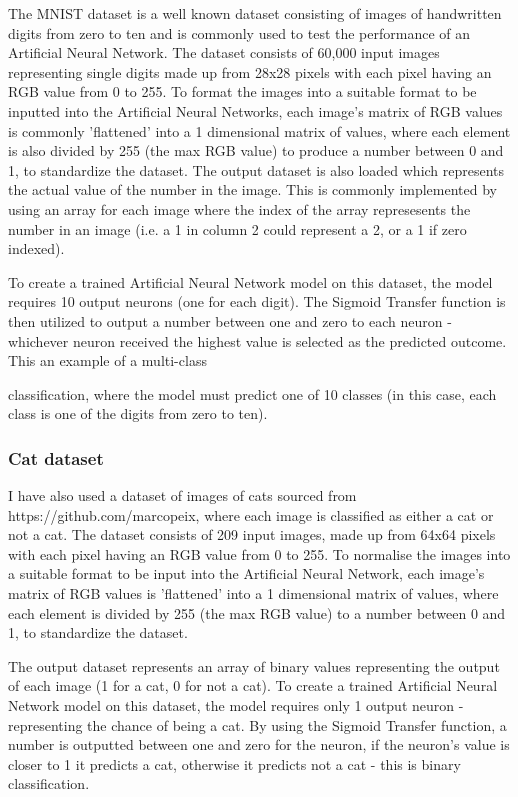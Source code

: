 \documentclass[./project-report/src/latex/project-report.tex]{subfiles}
\begin{document}
The MNIST dataset is a well known dataset consisting of images of handwritten digits from zero to ten and is commonly used to test the performance of an Artificial Neural 
Network. The dataset consists of 60,000 input images representing single digits made up from 28x28 pixels with each pixel having an RGB value from 0 to 255. To format the 
images into a suitable format to be inputted into the Artificial Neural Networks, each image's matrix of RGB values is commonly 'flattened' into a 1 dimensional matrix of 
values, where each element is also divided by 255 (the max RGB value) to produce a number between 0 and 1, to standardize the dataset. The output dataset is also loaded which 
represents the actual value of the number in the image. This is commonly implemented by using an array for each image where the index of the array represesents the number in 
an image (i.e. a 1 in column 2 could represent a 2, or a 1 if zero indexed).

To create a trained Artificial Neural Network model on this dataset, the model requires 10 output neurons (one for each digit). The Sigmoid Transfer function is then utilized 
to output a number between one and zero to each neuron - whichever neuron received the highest value is selected as the predicted outcome. This an example of a multi-class 

classification, where the model must predict one of 10 classes (in this case, each class is one of the digits from zero to ten).
\subsubsection{Cat dataset}

I have also used a dataset of images of cats sourced from https://github.com/marcopeix, where each image is classified as either a cat or not a cat. The dataset consists of 
209 input images, made up from 64x64 pixels with each pixel having an RGB value from 0 to 255. To normalise the images into a suitable format to be input into the Artificial 
Neural Network, each image's matrix of RGB values is 'flattened' into a 1 dimensional matrix of values, where each element is divided by 255 (the max RGB value) to a number 
between 0 and 1, to standardize the dataset.

The output dataset represents an array of binary values representing the output of each image (1 for a cat, 0 for not a cat). To create a trained Artificial Neural Network model 
on this dataset, the model requires only 1 output neuron - representing the chance of being a cat. By using the Sigmoid Transfer function, a number is outputted between one and zero 
for the neuron, if the neuron's value is closer to 1 it predicts a cat, otherwise it predicts not a cat - this is binary classification.
\end{document}
